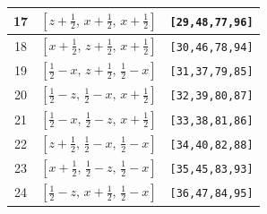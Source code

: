 \documentclass[fleqn,8pt]{jsarticle}
\begin{document}
\begin{longtable}{ccc}
17 & $\left[ z + \frac{1}{2},\, x + \frac{1}{2},\, x + \frac{1}{2} \right]$ & {\tt [29,48,77,96]} \\ \hline
18 & $\left[ x + \frac{1}{2},\, z + \frac{1}{2},\, x + \frac{1}{2} \right]$ & {\tt [30,46,78,94]} \\ \hline
19 & $\left[ \frac{1}{2} - x,\, z + \frac{1}{2},\, \frac{1}{2} - x \right]$ & {\tt [31,37,79,85]} \\ \hline
20 & $\left[ \frac{1}{2} - z,\, \frac{1}{2} - x,\, x + \frac{1}{2} \right]$ & {\tt [32,39,80,87]} \\ \hline
21 & $\left[ \frac{1}{2} - x,\, \frac{1}{2} - z,\, x + \frac{1}{2} \right]$ & {\tt [33,38,81,86]} \\ \hline
22 & $\left[ z + \frac{1}{2},\, \frac{1}{2} - x,\, \frac{1}{2} - x \right]$ & {\tt [34,40,82,88]} \\ \hline
23 & $\left[ x + \frac{1}{2},\, \frac{1}{2} - z,\, \frac{1}{2} - x \right]$ & {\tt [35,45,83,93]} \\ \hline
24 & $\left[ \frac{1}{2} - z,\, x + \frac{1}{2},\, \frac{1}{2} - x \right]$ & {\tt [36,47,84,95]} \\
\end{longtable}
\renewcommand{\arraystretch}{1.2}
\end{document}

